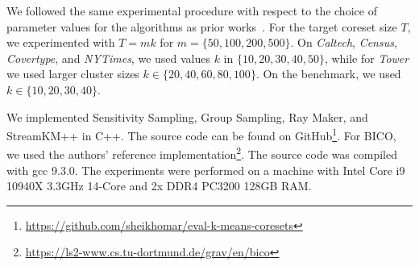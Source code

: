 We followed the same experimental procedure with respect to the choice of parameter values for the algorithms as prior works~\cite{AckermannMRSLS12, FGSSS13}. For the target coreset size $T$, we experimented with $T=mk$ for $m = \{50, 100, 200, 500\}$. On \textit{Caltech}, \textit{Census},  \textit{Covertype}, and \textit{NYTimes}, we used values $k$ in $\{10, 20, 30, 40, 50\}$, while for \textit{Tower} we used larger cluster sizes $k \in \{20, 40, 60, 80, 100\}$. On the benchmark, we used  $k \in \{10, 20, 30, 40\}$.


We implemented Sensitivity Sampling, Group Sampling, Ray Maker, and StreamKM++ in C++. The source code can be found on GitHub\footnote{\url{https://github.com/sheikhomar/eval-k-means-coresets}}. For BICO, we used the authors' reference implementation\footnote{\url{https://ls2-www.cs.tu-dortmund.de/grav/en/bico}}. The source code was compiled with gcc 9.3.0. The experiments were performed on a machine with Intel Core i9 10940X 3.3GHz 14-Core and 2x DDR4 PC3200 128GB RAM.



